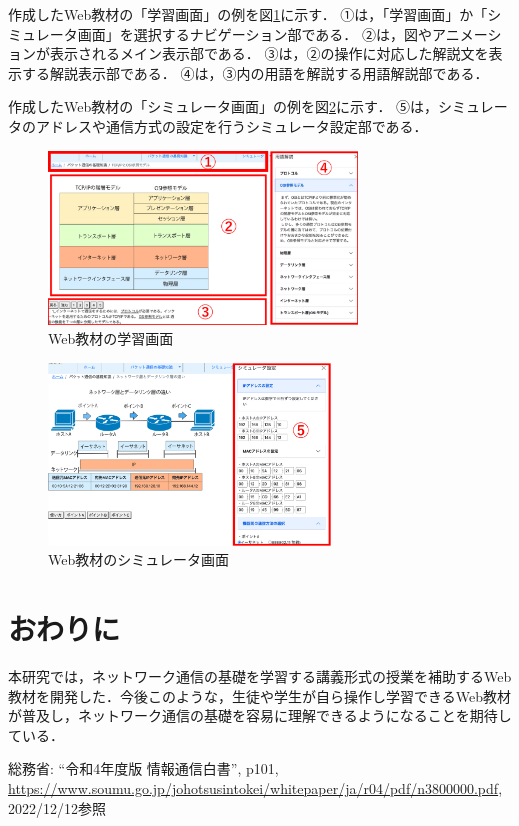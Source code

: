 \documentclass[twocolumn,10pt,a4j]{ltjsarticle}
\begin{document}
作成したWeb教材の「学習画面」の例を図\ref{fig:画面}に示す．
①は，「学習画面」か「シミュレータ画面」を選択するナビゲーション部である．
②は，図やアニメーションが表示されるメイン表示部である．
③は，②の操作に対応した解説文を表示する解説表示部である．
④は，③内の用語を解説する用語解説部である．

作成したWeb教材の「シミュレータ画面」の例を図\ref{fig:画面2}に示す．
⑤は，シミュレータのアドレスや通信方式の設定を行うシミュレータ設定部である．

\begin{figure}[h]
\begin{center}
 \includegraphics[clip,width=82mm]{figures/gamen.pdf}
\end{center}
 \caption{Web教材の学習画面}
 \label{fig:画面}
\end{figure}

\begin{figure}[h]
\begin{center}
 \includegraphics[clip,width=75mm]{figures/gamen2.pdf}
\end{center}
 \caption{Web教材のシミュレータ画面}
 \label{fig:画面2}
\end{figure}

\section{おわりに}
本研究では，ネットワーク通信の基礎を学習する講義形式の授業を補助するWeb教材を開発した．今後このような，生徒や学生が自ら操作し学習できるWeb教材が普及し，ネットワーク通信の基礎を容易に理解できるようになることを期待している．

\begin{thebibliography}{99}
 総務省: ``令和4年度版 情報通信白書'', p101, \url{https://www.soumu.go.jp/johotsusintokei/whitepaper/ja/r04/pdf/n3800000.pdf}, 2022/12/12参照

\end{thebibliography}
\end{document}
